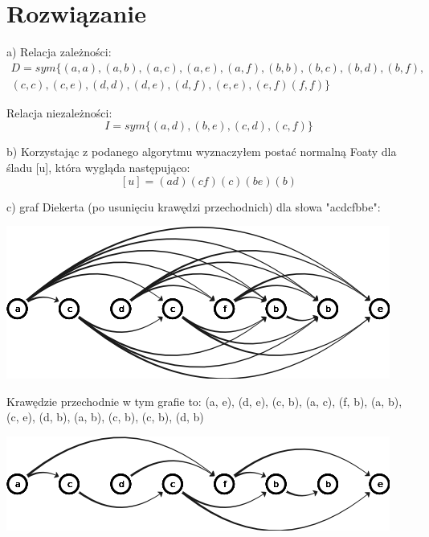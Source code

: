 \documentclass[12pt]{article}
\begin{document}
\newpage
\section{Rozwiązanie}
\noindent
a) Relacja zależności:
\[
\begin{array}{c}
D = sym\{ 
(a, a), (a, b), (a, c), (a, e), (a, f), (b, b), (b, c), (b, d), (b, f), \\
(c, c), (c, e), (d, d), (d, e), (d, f), (e, e), (e, f) (f, f)
\}
\end{array}
\]

Relacja niezależności:
\[ I = sym\{(a, d), (b, e), (c, d), (c, f)\}  \]

\noindent
b) Korzystając z podanego algorytmu wyznaczyłem postać normalną Foaty dla śladu [u], która wygląda następująco:
\[  [u] = (ad)(cf)(c)(be)(b)  \]

\noindent
c) graf Diekerta (po usunięciu krawędzi przechodnich) dla słowa "acdcfbbe":

\begin{center}
\centering
    \includegraphics{graph2.png}
\end{center}

\noindent
Krawędzie przechodnie w tym grafie to: (a, e), (d, e), (c, b), (a, c), (f, b), (a, b), (c, e), (d, b), (a, b), (c, b), (c, b), (d, b)

\begin{center}
\centering
    \includegraphics{graph2_reduced.png}
\end{center}
\end{document}
